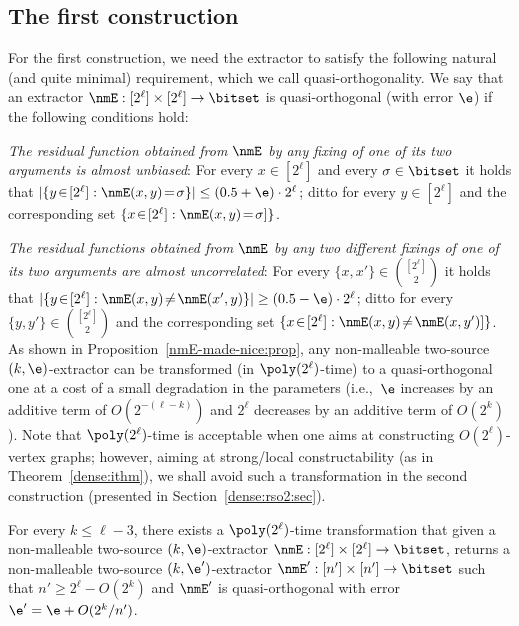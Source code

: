 \subsection{The first construction}
\label{dense:rso1:sec}
For the first construction, we need the extractor to satisfy
the following natural (and quite minimal) requirement,
which we call quasi-orthogonality.
%
We say that an extractor ${\nmE}:[2^\ell]\times[2^\ell]\to\bitset$
is {\sf quasi-orthogonal} (with error $\e$)
if the following conditions hold:
\BE
\item
{\em The residual function obtained from $\nmE$ by any fixing
of one of its two arguments is almost unbiased}:
For every $x\in[2^\ell]$ and every $\sigma\in\bitset$ it holds that
$|\{y\!\in\![2^\ell]:\nmE(x,y)\!=\!\sigma\}|\leq(0.5+\e)\cdot2^{\ell}$;
ditto for every $y\in[2^\ell]$
and the corresponding set $\{x\!\in\![2^\ell]:\nmE(x,y)\!=\!\sigma]\}$.
\item
{\em The residual functions obtained from $\nmE$ by any two different
fixings of one of its two arguments are almost uncorrelated}:
For every $\{x,x'\}\in\binom{[2^\ell]}{2}$ it holds that
$|\{y\!\in\![2^\ell]:\nmE(x,y)\!\neq\!\nmE(x',y)\}|\geq(0.5-\e)\cdot2^{\ell}$;
ditto for every $\{y,y'\}\in\binom{[2^\ell]}{2}$
and the corresponding set $\{x\!\in\![2^\ell]:\nmE(x,y)\!\neq\!\nmE(x,y')]\}$.
\EE
As shown in Proposition~\ref{nmE-made-nice:prop},
%
any non-malleable two-source $(k,\e)$-extractor
can be transformed (in $\poly(2^\ell)$-time)
to a quasi-orthogonal one
at a cost of a small degradation in the parameters
(i.e.,~$\e$ increases by an additive term of $O(2^{-(\ell-k)})$
and $2^\ell$ decreases by an additive term of $O(2^{k})$).
Note that $\poly(2^\ell)$-time is acceptable
when one aims at constructing $O(2^\ell)$-vertex graphs;
however, aiming at strong/local constructability
(as in Theorem~\ref{dense:ithm}),
we shall avoid such a transformation in the second construction
(presented in Section~\ref{dense:rso2:sec}).

\label{nmE-made-nice:prop}
For every $k\leq\ell-3$,
there exists a $\poly(2^\ell)$-time transformation
that given a non-malleable two-source $(k,\e)$-extractor
${\nmE}:[2^\ell]\times[2^\ell]\to\bitset$,
returns a non-malleable two-source $(k,\e')$-extractor
${\nmE'}:[n']\times[n']\to\bitset$ such that $n'\geq2^\ell-O(2^k)$
and $\nmE'$ is quasi-orthogonal with error $\e'=\e+O(2^k/n')$.
%
\EP
%

